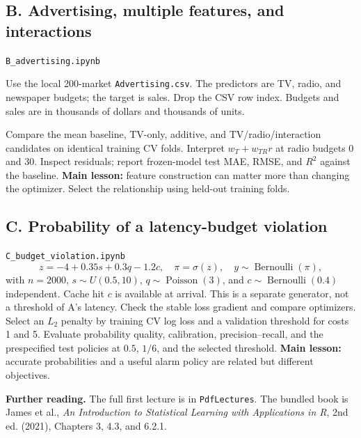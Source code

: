 \documentclass[11pt,a4paper]{article}
\newcommand{\code}[1]{\texttt{\small #1}}
\begin{document}
\subsection*{B. Advertising, multiple features, and interactions}
\code{B\_advertising.ipynb}

Use the local 200-market \code{Advertising.csv}. The predictors are TV, radio,
and newspaper budgets; the target is sales. Drop the CSV row index. Budgets and
sales are in thousands of dollars and thousands of units.

Compare the mean baseline, TV-only, additive, and TV/radio/interaction candidates
on identical training CV folds. Interpret $w_T+w_{TR}r$ at radio budgets 0 and 30.
Inspect residuals; report frozen-model test MAE, RMSE, and $R^2$ against the baseline.
\textbf{Main lesson:} feature construction can matter more than changing the
optimizer. Select the relationship using held-out training folds.

\subsection*{C. Probability of a latency-budget violation}
\code{C\_budget\_violation.ipynb}
\[
z=-4+0.35s+0.3q-1.2c,\quad \pi=\sigma(z),\quad y\sim\operatorname{Bernoulli}(\pi),
\]
with $n=2000$, $s\sim U(0.5,10)$, $q\sim\operatorname{Poisson}(3)$,
and $c\sim\operatorname{Bernoulli}(0.4)$ independent. Cache hit $c$ is
available at arrival. This is a separate generator, not a threshold of A's latency.
Check the stable loss gradient and compare optimizers. Select an $L_2$ penalty
by training CV log loss and a validation threshold for costs 1 and 5.
Evaluate probability quality, calibration, precision--recall, and the prespecified
test policies at $0.5$, $1/6$, and the selected threshold.
\textbf{Main lesson:} accurate probabilities and a useful alarm policy are
related but different objectives.

\small\textbf{Further reading.} The full first lecture is in \code{PdfLectures}.
The bundled book is James et al., \emph{An Introduction to Statistical Learning
with Applications in R}, 2nd ed. (2021), Chapters 3, 4.3, and 6.2.1.
\end{document}
